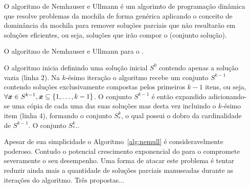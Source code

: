 O algoritmo de Nemhauser e Ullmann é um algorimto de programação dinâmica
que resolve problemas da mochila de forma genérica aplicando o conceito de
dominância da mochila para remover soluções parciais que não resultarão em
soluções eficientes, ou seja, soluções que irão compor o \paretoset (conjunto solução).

\begin{algorithm}
  \caption{O algoritmo de Nemhauser e Ullmann para o \mokp.}
  \label{alg:nemull}
  
\end{algorithm}

O algoritmo inicia definindo uma solução inicial $S^0$ contendo apenas a solução
vazia (linha 2).
Na $k$-ésimo iteração o algoritmo recebe um conjunto $S^{k-1}$ contendo
soluções exclusivamente compostas pelos primeiros ${k-1}$ itens,
ou seja, $\forall\boldsymbol{x} \in S^{k-1}, \boldsymbol{x} \subseteq \{1, \ldots, k-1\}$.
O conjunto $S^{k-1}$ é então expandido adicionando-se uma cópia de cada uma
das suas soluções mas desta vez incluindo o $k$-ésimo item (linha 4),
formando o conjunto $S^k_*$, o qual possui o dobro da cardinalidade de $S^{k-1}$.
O conjunto $S^k_*$..

Apesar de sua simplicidade o Algoritmo~\ref{alg:nemull} é consideravelmente poderoso.
Contudo o potencial crescimento exponencial do \paretoset para o \mokp
compromete severamente o seu desempenho.
Uma forma de atacar este problema é tentar reduzir ainda mais a quantidade de
soluções parciais manuseadas durante as iterações do algoritmo.
Três propostas...
